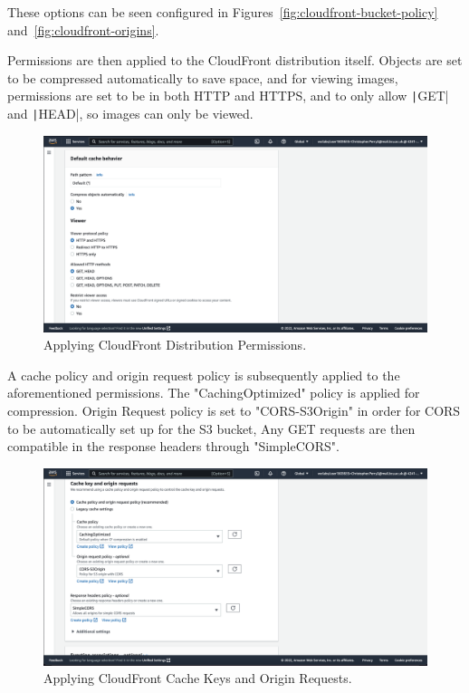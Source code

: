 These options can be seen configured in Figures~\ref{fig:cloudfront-bucket-policy} and~\ref{fig:cloudfront-origins}.

Permissions are then applied to the CloudFront distribution itself.
Objects are set to be compressed automatically to save space, and for viewing images, permissions are set to be in
both HTTP and HTTPS, and to only allow \texttt|GET| and \texttt|HEAD|, so images can only be viewed.

\begin{figure}[!htbp]
    \centering
    \includegraphics[width=\textwidth]{resources/cloudfront/cloudfront-cache-behaviour}
    \caption{Applying CloudFront Distribution Permissions.}
    \label{fig:cloudfront-cache-behaviour}
\end{figure}

A cache policy and origin request policy is subsequently applied to the aforementioned permissions.
The "CachingOptimized" policy is applied for compression.
Origin Request policy is set to "CORS-S3Origin" in order for CORS to be automatically set up for the S3 bucket,
Any GET requests are then compatible in the response headers through "SimpleCORS".

\begin{figure}[!htbp]
    \centering
    \includegraphics[width=\textwidth]{resources/cloudfront/cloudfront-cache-key}
    \caption{Applying CloudFront Cache Keys and Origin Requests.}
    \label{fig:cloudfront-cache-key}
\end{figure}

